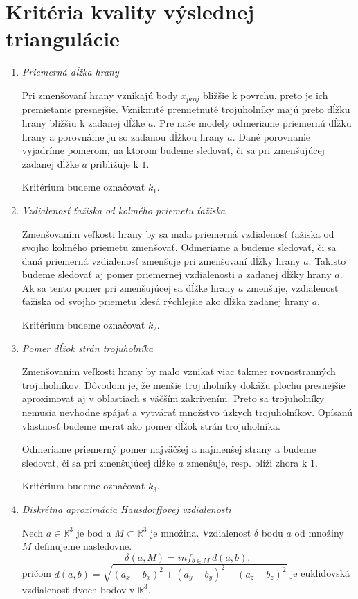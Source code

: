 \section{Kritéria kvality výslednej triangulácie}
\begin{enumerate}
\item{
    \textit{Priemerná dĺžka hrany}

    Pri zmenšovaní hrany vznikajú body $x_{proj}$ bližšie k povrchu, preto je ich premietanie
    presnejšie. Vzniknuté premietnuté trojuholníky majú preto dĺžku hrany bližšiu k zadanej dĺžke 
    $a$. Pre naše modely odmeriame priemernú dĺžku hrany a porovnáme ju so zadanou dĺžkou hrany $a$. 
    Dané porovnanie vyjadríme 
    pomerom, na ktorom budeme sledovať, či sa pri zmenšujúcej zadanej dĺžke $a$ približuje k $1$.

    Kritérium budeme označovať $k_1$.
}
\item{
    \textit{Vzdialenosť ťažiska od kolmého priemetu ťažiska}

    Zmenšovaním veľkosti hrany by sa mala priemerná vzdialenosť ťažiska od svojho kolmého 
    priemetu zmenšovať. Odmeriame a budeme sledovať, či sa daná priemerná vzdialenosť
    zmenšuje pri zmenšovaní dĺžky hrany $a$. Takisto budeme sledovať aj pomer priemernej 
    vzdialenosti a zadanej dĺžky hrany $a$. Ak sa tento pomer pri zmenšujúcej sa dĺžke hrany 
    $a$ zmenšuje, vzdialenosť 
    ťažiska od svojho priemetu klesá rýchlejšie ako dĺžka zadanej hrany $a$.

    Kritérium budeme označovať $k_2$.
}
\item{
    \textit{Pomer dĺžok strán trojuholníka}

    Zmenšovaním veľkosti hrany by malo vznikať viac takmer rovnostranných trojuholníkov.
    Dôvodom je, že menšie trojuholníky dokážu plochu presnejšie aproximovať aj v oblastiach 
    s väčším zakrivením. Preto sa trojuholníky nemusia nevhodne spájať a vytvárať množstvo 
    úzkych trojuholníkov. Opísanú vlastnosť budeme merať ako pomer dĺžok strán trojuholníka. 

    Odmeriame priemerný pomer najväčšej a najmenšej strany a budeme sledovať, či sa pri 
    zmenšujúcej dĺžke $a$ zmenšuje, resp. blíži zhora k $1$.

    Kritérium budeme označovať $k_3$.
}
\item{
    \textit{Diskrétna aproximácia Hausdorffovej vzdialenosti}

    \begin{definition}
        Nech $a \in \mathbb{R}^3$ je bod a $M \subset \mathbb{R}^3$ je množina.
        Vzdialenosť $\delta$ bodu $a$ od množiny $M$ definujeme nasledovne.
        \begin{equation}
            \delta(a, M) = inf_{b \in M} \, d(a, b),
        \end{equation}
        pričom $d(a, b) = \sqrt{(a_x-b_x)^2 + (a_y-b_y)^2 + (a_z-b_z)^2}$ je euklidovská 
        vzdialenosť dvoch bodov v $\mathbb{R}^3$.
    \end{definition}

}
\end{enumerate}
